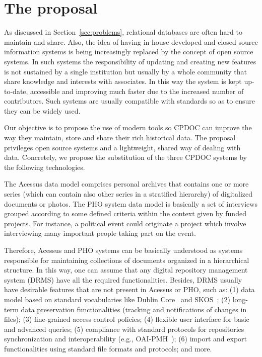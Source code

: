 \section{The proposal}\label{sec:proposal}

As discussed in Section~\ref{sec:problems}, relational databases are
often hard to maintain and share. Also, the idea of having in-house
developed and closed source information systems is being increasingly
replaced by the concept of open source systems. In such systems the
responsibility of updating and creating new features is not sustained
by a single institution but usually by a whole community that share
knowledge and interests with associates. In this way the system is
kept up-to-date, accessible and improving much faster due to the
increased number of contributors. Such systems are usually compatible
with standards so as to ensure they can be widely used.

Our objective is to propose the use of modern tools so CPDOC can
improve the way they maintain, store and share their rich historical
data. The proposal privileges open source systems and a lightweight,
shared way of dealing with data. Concretely, we propose the
substitution of the three CPDOC systems by the following technologies.


The Acessus data model comprises personal archives that contains one
or more series (which can contain also other series in a stratified
hierarchy) of digitalized documents or photos. The PHO system data
model is basically a set of interviews grouped according to some
defined criteria within the context given by funded projects. For
instance, a political event could originate a project which involve
interviewing many important people taking part on the event.

Therefore, Acessus and PHO systems can be basically understood as
systems responsible for maintaining collections of documents organized
in a hierarchical structure. In this way, one can assume that any
digital repository management system (DRMS) have all the required
functionalities. Besides, DRMS usually have desirable features that
are not present in Acessus or PHO, such as: (1) data model based on
standard vocabularies like Dublin Core~\cite{dc} and SKOS~\cite{skos};
(2) long-term data preservation functionalities (tracking and
notifications of changes in files); (3) fine-grained access control
policies; (4) flexible user interface for basic and advanced queries;
(5) compliance with standard protocols for repositories
synchronization and interoperability (e.g., OAI-PMH~\cite{oai}); (6)
import and export functionalities using standard file formats and
protocols; and more.

